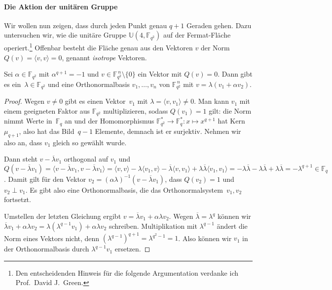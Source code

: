 \paragraph{Die Aktion der unitären Gruppe} Wir wollen nun zeigen, dass durch jeden Punkt genau $q+1$ Geraden gehen. Dazu untersuchen wir, wie die unitäre Gruppe $\mathbb U(4, \mathbb F_{q^2})$ auf der Fermat-Fläche operiert.\footnote{Den entscheidenden Hinweis für die folgende Argumentation verdanke ich Prof.~David J.~Green.} Offenbar besteht die Fläche genau aus den Vektoren $v$ der Norm $Q(v) = \langle v, v \rangle = 0$, genannt \emph{isotrope} Vektoren.
\begin{lemma}
Sei $\alpha \in \mathbb F_{q^2}$ mit $\alpha^{q+1} = -1$ und $v \in \mathbb F_{\!q^2}^{\,n} \setminus \{0\}$ ein Vektor mit $Q(v) = 0$. Dann gibt es ein~$\lambda \in \mathbb F_{q^2}$ und eine Orthonormalbasis $v_1, \dots, v_n$ von $\mathbb F_{\!q^2}^{\,n}$ mit $v = \lambda (v_1 + \alpha v_2)$.
\end{lemma}
\begin{proof}
Wegen $v \neq 0$ gibt es einen Vektor~$v_1$ mit $\lambda = \langle v, v_1 \rangle \neq 0$. Man kann $v_1$ mit einem geeigneten Faktor aus $\mathbb F_{\!q^2}$ multiplizieren, sodass $Q(v_1) = 1$ gilt: die Norm nimmt Werte in~$\mathbb F_q$ an und der Homomorphismus $\mathbb F_{\!q^2}^* \to \mathbb F_q^*: x \mapsto x^{q+1}$ hat Kern~$\mu_{q+1}$, also hat das Bild~$q-1$ Elemente, demnach ist er surjektiv. Nehmen wir also an, dass $v_1$ gleich so gewählt wurde.

Dann steht $v - \overline{\lambda} v_1$ orthogonal auf $v_1$ und $Q(v - \overline{\lambda} v_1) = \langle v - \overline{\lambda} v_1, v - \overline{\lambda} v_1 \rangle = \langle v, v \rangle - \lambda \langle v_1, v \rangle - \overline{\lambda} \langle v, v_1 \rangle + \lambda\overline{\lambda} \langle v_1, v_1 \rangle = - \lambda \overline{\lambda} - \lambda \overline{\lambda} + \lambda \overline{\lambda} = -\lambda^{q+1} \in \mathbb F_q$. Damit gilt für den Vektor $v_2 = (\alpha\lambda)^{-1} (v - \overline{\lambda} v_1)$, dass $Q(v_2) = 1$ und $v_2 \perp v_1$. Es gibt also eine Orthonormalbasis, die das Orthonormalsystem~$v_1, v_2$ fortsetzt.

Umstellen der letzten Gleichung ergibt $v = \overline{\lambda} v_1 + \alpha\lambda v_2$. Wegen $\overline{\lambda} = \lambda^q$ können wir $\overline{\lambda} v_1 + \alpha\lambda v_2 = \lambda(\lambda^{q-1} v_1) + \alpha\lambda v_2$ schreiben. Multiplikation mit $\lambda^{q-1}$ ändert die Norm eines Vektors nicht, denn $(\lambda^{q-1})^{q+1} = \lambda^{q^2-1} = 1$. Also können wir $v_1$ in der Orthonormalbasis durch $\lambda^{q-1} v_1$ ersetzen.
\end{proof}


